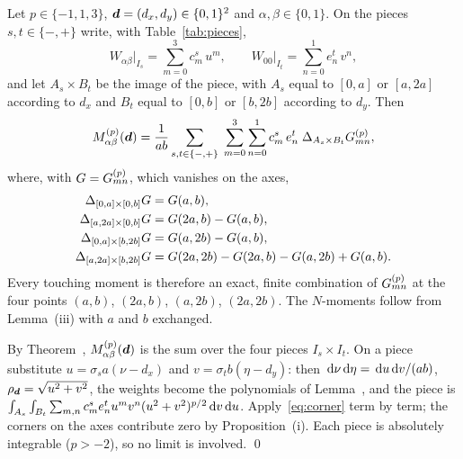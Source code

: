 \begin{table}[ht]
    \centering
    \caption{The weights~\eqref{eq:weights} on the pieces of Lemma~ ($x$-direction).}
    \label{tab:pieces}
    \renewcommand{\arraystretch}{1.35}
    
\end{table}

 Let $p\in\{-1,1,3\}$, $\vb*{d}=(d_x,d_y)\in\{0,1\}^2$ and $\alpha,\beta\in\{0,1\}$.
On the pieces $s,t\in\{-,+\}$ write, with Table~\ref{tab:pieces},
\begin{equation}
    W_{\alpha\beta}\big|_{I_s} = \sum_{m=0}^{3}c^{s}_{m}\,u^{m}, \qquad
    W_{00}\big|_{I_t} = \sum_{n=0}^{1}e^{t}_{n}\,v^{n},
\end{equation}
and let $A_s\times B_t$ be the image of the piece, with $A_s$ equal to $[0,a]$ or $[a,2a]$ according to $d_x$ and $B_t$
equal to $[0,b]$ or $[b,2b]$ according to $d_y$. Then
\begin{equation}
    \label{eq:touching}
    M^{(p)}_{\alpha\beta}(\vb*{d}) = \frac{1}{ab}\sum_{s,t\in\{-,+\}}\;\sum_{m=0}^{3}\sum_{n=0}^{1}
    c^{s}_{m}\,e^{t}_{n}\;\Delta_{A_s\times B_t}G^{(p)}_{mn},
\end{equation}
where, with $G=G^{(p)}_{mn}$, which vanishes on the axes,
\begin{equation}
    \label{eq:fourpoints}
    \begin{aligned}
        \Delta_{[0,a]\times[0,b]}G   &= G(a,b),\\
        \Delta_{[a,2a]\times[0,b]}G  &= G(2a,b)-G(a,b),\\
        \Delta_{[0,a]\times[b,2b]}G  &= G(a,2b)-G(a,b),\\
        \Delta_{[a,2a]\times[b,2b]}G &= G(2a,2b)-G(2a,b)-G(a,2b)+G(a,b).
    \end{aligned}
\end{equation}
Every touching moment is therefore an exact, finite combination of $G^{(p)}_{mn}$ at the four points $(a,b)$, $(2a,b)$,
$(a,2b)$, $(2a,2b)$. The $N$-moments follow from Lemma~(iii) with $a$ and $b$ exchanged.

\vspace{\baselineskip}
\proof
By Theorem~, $M^{(p)}_{\alpha\beta}(\vb*{d})$ is the sum over the four pieces $I_s\times I_t$. On a piece
substitute $u=\sigma_s a(\nu-d_x)$ and $v=\sigma_t b(\eta-d_y)$: then $\,\mathrm{d}\nu\,\mathrm{d}\eta=\,\mathrm{d} u\,\mathrm{d} v/(ab)$,
$\rho_{\vb*{d}}=\sqrt{u^2+v^2}$, the weights become the polynomials of Lemma~, and the piece is
$\int_{A_s}\int_{B_t}\sum_{m,n}c^s_me^t_nu^mv^n(u^2+v^2)^{p/2}\,\mathrm{d} v\,\mathrm{d} u$. Apply~\eqref{eq:corner} term by term; the
corners on the axes contribute zero by Proposition~(i). Each piece is absolutely integrable
($p>-2$), so no limit is involved. \qed

